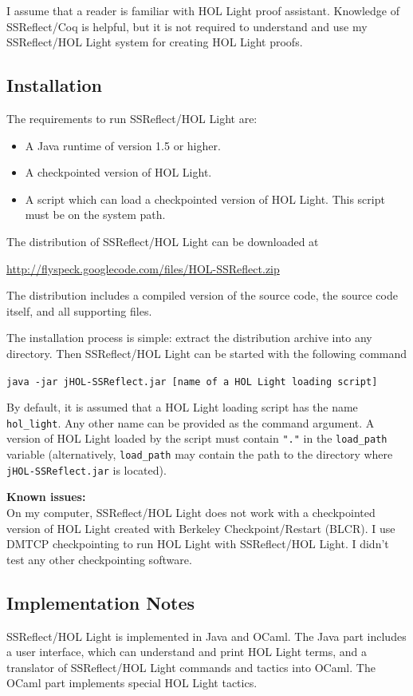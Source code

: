 \documentclass[a4paper]{article}
\newcommand{\issues}{{\bf Known issues:}\\}
\begin{document}
I assume that a reader is familiar with HOL Light proof assistant. Knowledge of SSReflect/Coq is helpful, but it is not required to understand and use my SSReflect/HOL Light system for creating HOL Light proofs.

\subsection{Installation}
The requirements to run SSReflect/HOL Light are:
\begin{itemize}
\item A Java runtime of version 1.5 or higher.
\item A checkpointed version of HOL Light.
\item A script which can load a checkpointed version of HOL Light. This script must be on the system path.
\end{itemize}

The distribution of SSReflect/HOL Light can be downloaded at

\url{http://flyspeck.googlecode.com/files/HOL-SSReflect.zip}

The distribution includes a compiled version of the source code, the source code itself, and all supporting files.

The installation process is simple: extract the distribution archive into any directory. Then SSReflect/HOL Light can be started with the following command

\verb|java -jar jHOL-SSReflect.jar [name of a HOL Light loading script]|

By default, it is assumed that a HOL Light loading script has the name \verb|hol_light|. Any other name can be provided as the command argument. A version of HOL Light loaded by the script must contain \verb|"."| in the \verb|load_path| variable (alternatively, \verb|load_path| may contain the path to the directory where {\tt jHOL-SSReflect.jar} is located).

\issues
On my computer, SSReflect/HOL Light does not work with a checkpointed version of HOL Light created with Berkeley Checkpoint/Restart (BLCR). I use DMTCP checkpointing to run HOL Light with SSReflect/HOL Light. I didn't test any other checkpointing software.


\subsection{Implementation Notes}
SSReflect/HOL Light is implemented in Java and OCaml. The Java part includes a user interface, which can understand and print HOL Light terms, and a translator of SSReflect/HOL Light commands and tactics into OCaml. The OCaml part implements special HOL Light tactics.
\end{document}

